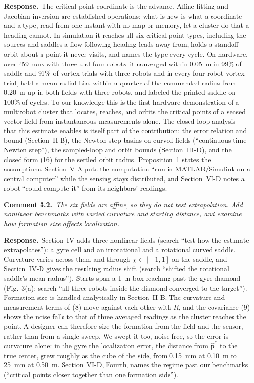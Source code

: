 \documentclass[10pt]{article}
\newcommand{\rev}[1]{#1}                             %
\newcommand{\cmt}[2]{\textbf{Comment #1.}~\textit{#2}\par}
\newcommand{\resp}{\par\textbf{Response.}~}
\begin{document}
\resp The critical point coordinate is the advance. Affine fitting and Jacobian inversion are established operations; what is new is what a coordinate and a type, read from one instant with no map or memory, let a cluster do that a heading cannot. In simulation it reaches all six critical point types, including the sources and saddles a flow-following heading leads away from, holds a standoff orbit about a point it never visits, and names the type every cycle. On hardware, over \rev{459} runs with three and four robots, it converged within 0.05~m in \rev{99}\% of saddle and \rev{91}\% of vortex trials with three robots and in every four-robot vortex trial, held a mean radial bias within a quarter of the commanded radius from \rev{0.20}~m up in both fields with three robots, and labeled the printed saddle on \rev{100}\% of cycles. To our knowledge this is the first hardware demonstration of a multirobot cluster that locates, reaches, and orbits the critical points of a sensed vector field from instantaneous measurements alone. The closed-loop analysis that this estimate enables is itself part of the contribution: the error relation and bound (Section~II-B), the Newton-step basins on curved fields (``continuous-time Newton step''), the sampled-loop and orbit bounds (Section~III-D), and the closed form (16) for the settled orbit radius. Proposition~1 states the assumptions. Section~V-A puts the computation ``run in MATLAB/Simulink on a central computer'' while the sensing stays distributed, and Section~VI-D notes a robot ``could compute it'' from its neighbors' readings.

\cmt{3.2}{The six fields are affine, so they do not test extrapolation. Add nonlinear benchmarks with varied curvature and starting distance, and examine how formation size affects localization.}

\resp Section~IV adds three nonlinear fields (search ``test how the estimate extrapolates''): a gyre cell and an irrotational and a rotational curved saddle. Curvature varies across them and through $\chi \in [-1, 1]$ on the saddle, and Section~IV-D gives the resulting radius shift (search ``shifted the rotational saddle's mean radius''). Starts span a 1~m box reaching past the gyre diamond (Fig.~3(a); search ``all three robots inside the diamond converged to the target''). Formation size is handled analytically in Section~II-B. The curvature and measurement terms of (8) move against each other with $R$, and the covariance (9) shows the noise falls to that of three averaged readings as the cluster reaches the point. A designer can therefore size the formation from the field and the sensor, rather than from a single sweep. We swept it too, noise-free, so the error is curvature alone: in the gyre the localization error, the distance from $\hat{\mathbf{p}}^*$ to the true center, grew roughly as the cube of the side, from \rev{0.15}~mm at 0.10~m to \rev{25}~mm at 0.50~m. Section~VI-D, Fourth, names the regime past our benchmarks (``critical points closer together than one formation side'').
\end{document}
